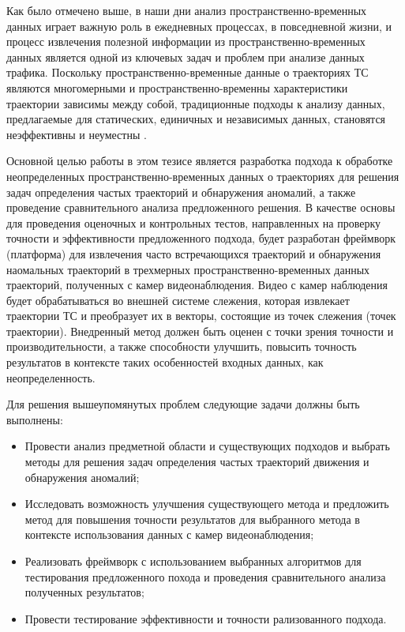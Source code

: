Как было отмечено выше, в наши дни анализ пространственно-временных данных играет важную роль в ежедневных процессах, в повседневной жизни, и процесс извлечения полезной информации из пространственно-временных данных является одной из ключевых задач и проблем при анализе данных трафика. Поскольку пространственно-временные данные о траекториях ТС являются многомерными и пространственно-временны характеристики траектории зависимы между собой, традиционные подходы к анализу данных, предлагаемые для статических, единичных и независимых данных, становятся неэффективны и неуместны \cite{article:8_review_mot_cl_alg}. 

Основной целью работы в этом тезисе является разработка подхода к обработке неопределенных пространственно-временных данных о траекториях для решения задач определения частых траекторий и обнаружения аномалий, а также проведение сравнительного анализа предложенного решения. В качестве основы для проведения оценочных и контрольных тестов, направленных на проверку точности и эффективности предложенного подхода, будет разработан фреймворк (платформа) для извлечения часто встречающихся траекторий и обнаружения наомальных траекторий в трехмерных пространственно-временных данных траекторий, полученных с камер видеонаблюдения. Видео с камер наблюдения будет обрабатываться во внешней системе слежения, которая извлекает траектории ТС и преобразует их в векторы, состоящие из точек слежения (точек траектории). Внедренный метод должен быть оценен с точки зрения точности и производительности, а также способности улучшить, повысить точность результатов в контексте таких особенностей входных данных, как неопределенность.

Для решения вышеупомянутых проблем следующие задачи должны быть выполнены:

\begin{itemize}
	\item Провести анализ предметной области и существующих подходов и выбрать методы для решения задач определения частых траекторий движения и обнаружения аномалий;
	\item Исследовать возможность улучшения существующего метода и предложить метод для повышения точности результатов для выбранного метода в контексте использования данных с камер видеонаблюдения;
	\item Реализовать фреймворк с использованием выбранных алгоритмов для тестирования предложенного похода и проведения сравнительного анализа полученных результатов;
	\item Провести тестирование эффективности и точности рализованного подхода.
\end{itemize}

